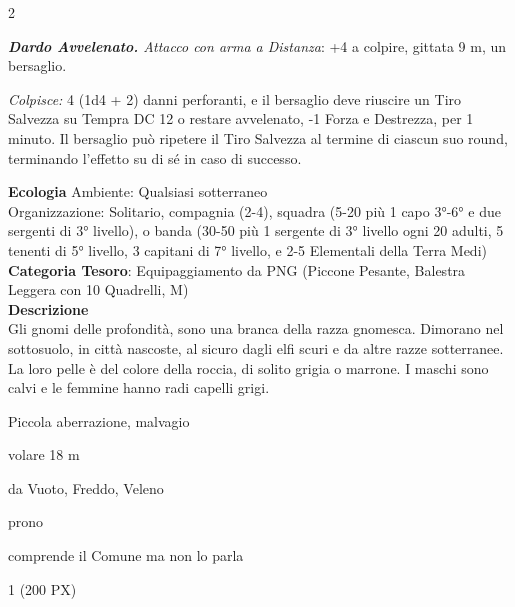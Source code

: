 \begin{multicols}{2}
{\emph{\textbf{Dardo Avvelenato.} Attacco con arma a Distanza}: +4 a colpire, gittata 9 m, un bersaglio.

\emph{Colpisce:} 4 (1d4 + 2) danni perforanti, e il bersaglio deve riuscire un Tiro Salvezza su Tempra DC 12 o restare avvelenato, -1 Forza e Destrezza, per 1 minuto. Il bersaglio può ripetere il Tiro Salvezza al termine di ciascun suo round, terminando l'effetto su di sé in caso di successo.

\textbf{Ecologia}
Ambiente: Qualsiasi sotterraneo\\
Organizzazione: Solitario, compagnia (2-4), squadra (5-20 più 1 capo 3°-6° e due sergenti di 3° livello), o banda (30-50 più 1 sergente di 3° livello ogni 20 adulti, 5 tenenti di 5° livello, 3 capitani di 7° livello, e 2-5 Elementali della Terra Medi)\\
\textbf{Categoria Tesoro}: Equipaggiamento da PNG (Piccone Pesante, Balestra Leggera con 10 Quadrelli, M)\\
\textbf{Descrizione}\\
Gli gnomi delle profondità, sono una branca della razza gnomesca. Dimorano nel sottosuolo, in città nascoste, al sicuro dagli elfi scuri e da altre razze sotterranee. La loro pelle è del colore della roccia, di solito grigia o marrone. I maschi sono calvi e le femmine hanno radi capelli grigi.

\begin{description}[noitemsep, topsep=0pt, parsep=0pt, partopsep=0pt, itemsep=1pt, leftmargin=2.35cm,  labelwidth=2.2cm, itemindent=0cm, listparindent=0pt] %
\setlength{\baselineskip}{10pt}
\item[\textbf{Taglia/Tipo}] Piccola aberrazione, malvagio
\item[\textbf{Caratt.}] 
\item[\textbf{Punti Ferita}] 
\item[\textbf{Movimento}] volare 18 m
\item[\textbf{Tiri Salvez.}] 
\item[\textbf{Imm. Danni}] da Vuoto, Freddo, Veleno\\
\item[\textbf{Immunità}] prono
\item[\textbf{Sensi}] 
\item[\textbf{Linguaggi}] comprende il Comune ma non lo parla
\item[\textbf{Sfida}] 1 (200 PX)
\end{description}
\smallskip

}
\end{multicols}
